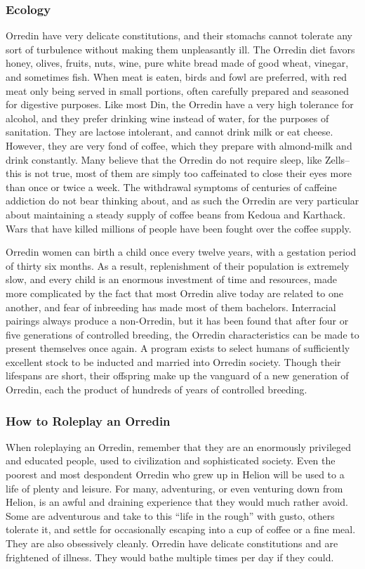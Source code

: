 \documentclass[oneside,11pt,english]{book}
\begin{document}
\subsubsection*{Ecology} 
Orredin have very delicate constitutions, and their stomachs cannot tolerate any sort of turbulence without 
making them unpleasantly ill. The Orredin diet favors honey, olives, fruits, nuts, wine, pure white bread 
made of good wheat, vinegar, and sometimes fish. When meat is eaten, birds and fowl are preferred, with 
red meat only being served in small portions, often carefully prepared and seasoned for digestive 
purposes. Like most Din, the Orredin have a very high tolerance for alcohol, and they prefer drinking 
wine instead of water, for the purposes of sanitation. They are lactose intolerant, and cannot drink milk or 
eat cheese. However, they are very fond of coffee, which they prepare with almond-milk and drink 
constantly. Many believe that the Orredin do not require sleep, like Zells--this is not true, most of them 
are simply too caffeinated to close their eyes more than once or twice a week. The withdrawal symptoms 
of centuries of caffeine addiction do not bear thinking about, and as such the Orredin are very particular 
about maintaining a steady supply of coffee beans from Kedoua and Karthack. Wars that have killed 
millions of people have been fought over the coffee supply. 


Orredin women can birth a child once every twelve years, with a gestation period of thirty six months. As 
a result, replenishment of their population is extremely slow, and every child is an enormous investment 
of time and resources, made more complicated by the fact that most Orredin alive today are related to one 
another, and fear of inbreeding has made most of them bachelors. 
Interracial pairings always produce a non-Orredin, but it has been found that after four or five generations 
of controlled breeding, the Orredin characteristics can be made to present themselves once again. A 
program exists to select humans of sufficiently excellent stock to be inducted and married into Orredin 
society. Though their lifespans are short, their offspring make up the vanguard of a new generation of 
Orredin, each the product of hundreds of years of controlled breeding. 


\subsubsection{How to Roleplay an Orredin}
When roleplaying an Orredin, remember that they are an enormously privileged and educated people, 
used to civilization and sophisticated society. Even the poorest and most despondent Orredin who grew 
up in Helion will be used to a life of plenty and leisure. For many, adventuring, or even venturing down 
from Helion, is an awful and draining experience that they would much rather avoid. Some are 
adventurous and take to this “life in the rough” with gusto, others tolerate it, and settle for occasionally 
escaping into a cup of coffee or a fine meal. 
They are also obsessively cleanly. Orredin have delicate constitutions and are frightened of illness. They 
would bathe multiple times per day if they could. 
\end{document}
